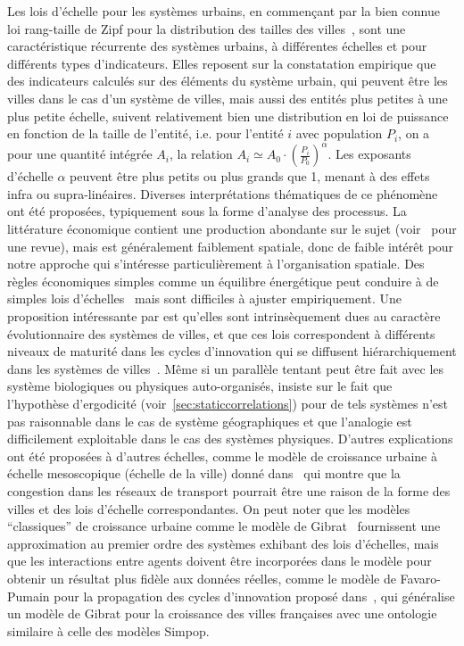 {Les lois d'échelle pour les systèmes urbains, en commençant par la bien connue loi rang-taille de Zipf pour la distribution des tailles des villes~\cite{gabaix1999zipf}, sont une caractéristique récurrente des systèmes urbains, à différentes échelles et pour différents types d'indicateurs. Elles reposent sur la constatation empirique que des indicateurs calculés sur des éléments du système urbain, qui peuvent être les villes dans le cas d'un système de villes, mais aussi des entités plus petites à une plus petite échelle, suivent relativement bien une distribution en loi de puissance en fonction de la taille de l'entité, i.e. pour l'entité $i$ avec population $P_i$, on a pour une quantité intégrée $A_i$, la relation $A_i \simeq A_0\cdot \left(\frac{P_i}{P_0}\right)^{\alpha}$. Les exposants d'échelle $\alpha$ peuvent être plus petits ou plus grands que 1, menant à des effets infra ou supra-linéaires. Diverses interprétations thématiques de ce phénomène ont été proposées, typiquement sous la forme d'analyse des processus. La littérature économique contient une production abondante sur le sujet (voir~\cite{Gabaix20042341} pour une revue), mais est généralement faiblement spatiale, donc de faible intérêt pour notre approche qui s'intéresse particulièrement à l'organisation spatiale. Des règles économiques simples comme un équilibre énergétique peut conduire à de simples lois d'échelles~\cite{bettencourt2008large} mais sont difficiles à ajuster empiriquement. Une proposition intéressante par  est qu'elles sont intrinsèquement dues au caractère évolutionnaire des systèmes de villes, et que ces lois correspondent à différents niveaux de maturité dans les cycles d'innovation qui se diffusent hiérarchiquement dans les systèmes de villes~\cite{pumain2006evolutionary}. Même si un parallèle tentant peut être fait avec les système biologiques ou physiques auto-organisés, \cite{pumain2012urban} insiste sur le fait que l'hypothèse d'ergodicité (voir~\ref{sec:staticcorrelations}) pour de tels systèmes n'est pas raisonnable dans le cas de système géographiques et que l'analogie est difficilement exploitable dans le cas des systèmes physiques. D'autres explications ont été proposées à d'autres échelles, comme le modèle de croissance urbaine à échelle mesoscopique (échelle de la ville) donné dans~\cite{2014arXiv1401.8200L} qui montre que la congestion dans les réseaux de transport pourrait être une raison de la forme des villes et des lois d'échelle correspondantes. On peut noter que les modèles ``classiques'' de croissance urbaine comme le modèle de Gibrat~\cite{favaro2011gibrat} fournissent une approximation au premier ordre des systèmes %
 exhibant des lois d'échelles, mais que les interactions entre agents doivent être incorporées dans le modèle pour obtenir un résultat plus fidèle aux données réelles, comme le modèle de Favaro-Pumain pour la propagation des cycles d'innovation proposé dans~\cite{favaro2011gibrat}, qui généralise un modèle de Gibrat pour la croissance des villes françaises avec une ontologie similaire à celle des modèles Simpop.
}

